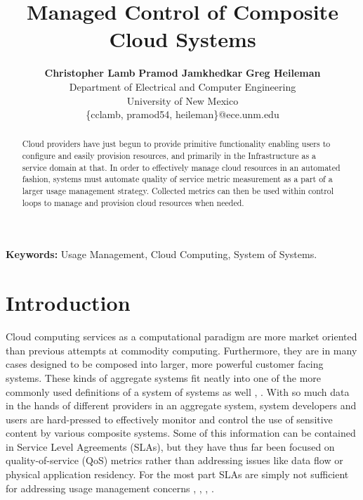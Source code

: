 \documentclass[times, 10pt,twocolumn]{article}
\begin{document}
\title{Managed Control of Composite Cloud Systems}

\author{
        \textbf{Christopher Lamb}\hspace*{0.3in}
        \textbf{Pramod Jamkhedkar}\hspace*{0.3in}
        \textbf{Greg Heileman}\\
        Department of Electrical and Computer Engineering \\
        University of New Mexico \\
        \small{\{cclamb, pramod54, heileman\}@ece.unm.edu}
}

\maketitle
\thispagestyle{empty}

\begin{abstract}
Cloud providers have just begun to provide primitive functionality enabling users to configure and easily provision resources, and primarily in the Infrastructure as a service domain at that.  In order to effectively manage cloud resources in an automated fashion, systems must automate quality of service metric measurement as a part of a larger usage management strategy.  Collected metrics can then be used within control loops to manage and provision cloud resources when needed.
\end{abstract}

{
\setlength{\parindent}{0mm}
\textbf{Keywords:} Usage Management, Cloud Computing, System of Systems.
}

\section{Introduction}
Cloud computing services as a computational paradigm are more market oriented than previous attempts at commodity computing.  Furthermore, they are in many cases designed to be composed into larger, more powerful customer facing systems.  These kinds of aggregate systems fit neatly into one of the more commonly used definitions of a system of systems as well \cite{Sose:SageCuppan:2001}, \cite{Sose:Web:Defns}.  With so much data in the hands of different providers in an aggregate system, system developers and users are hard-pressed to effectively monitor and control the use of sensitive content by various composite systems.  Some of this information can be contained in Service Level Agreements (SLAs), but they have thus far been focused on quality-of-service (QoS) metrics rather than addressing issues like data flow or physical application residency.  For the most part SLAs are simply not sufficient for addressing usage management concerns \cite{WSA}, \cite{WSLA}, \cite{WSP}, \cite{PaRaSh:09}.
\end{document}
